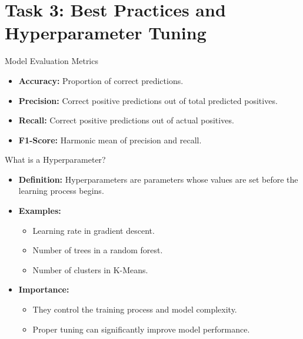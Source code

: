 \documentclass{beamer}
\begin{document}
\section{Task 3: Best Practices and Hyperparameter Tuning}

\begin{frame}{Model Evaluation Metrics}
\begin{itemize}
    \item \textbf{Accuracy:} Proportion of correct predictions.
    \item \textbf{Precision:} Correct positive predictions out of total predicted positives.
    \item \textbf{Recall:} Correct positive predictions out of actual positives.
    \item \textbf{F1-Score:} Harmonic mean of precision and recall.
\end{itemize}
\end{frame}

\begin{frame}{What is a Hyperparameter?}
\begin{itemize}
    \item \textbf{Definition:} Hyperparameters are parameters whose values are set before the learning process begins.
    \item \textbf{Examples:}
    \begin{itemize}
        \item Learning rate in gradient descent.
        \item Number of trees in a random forest.
        \item Number of clusters in K-Means.
    \end{itemize}
    \item \textbf{Importance:}
    \begin{itemize}
        \item They control the training process and model complexity.
        \item Proper tuning can significantly improve model performance.
    \end{itemize}
\end{itemize}
\end{frame}
\end{document}

